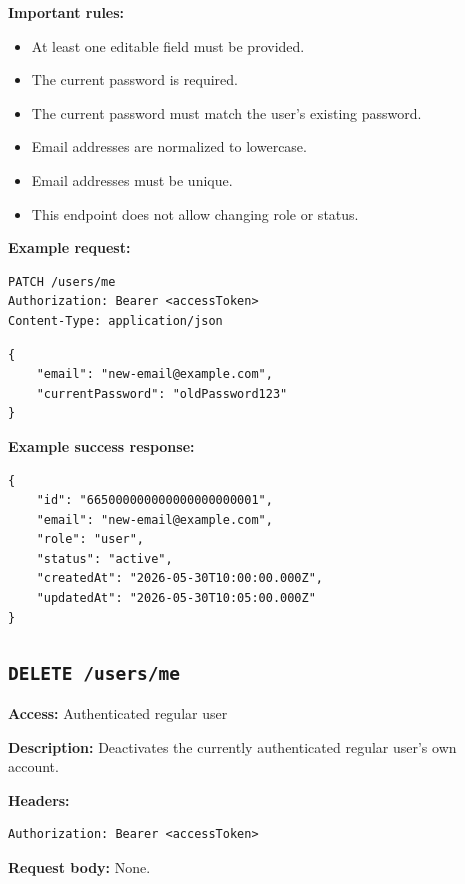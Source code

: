 \textbf{Important rules:}

\begin{itemize}
    \item At least one editable field must be provided.
    \item The current password is required.
    \item The current password must match the user's existing password.
    \item Email addresses are normalized to lowercase.
    \item Email addresses must be unique.
    \item This endpoint does not allow changing role or status.
\end{itemize}

\pagebreak
\textbf{Example request:}

\begin{verbatim}
PATCH /users/me
Authorization: Bearer <accessToken>
Content-Type: application/json
\end{verbatim}

\begin{verbatim}
{
    "email": "new-email@example.com",
    "currentPassword": "oldPassword123"
}
\end{verbatim}

\textbf{Example success response:}

\begin{verbatim}
{
    "id": "665000000000000000000001",
    "email": "new-email@example.com",
    "role": "user",
    "status": "active",
    "createdAt": "2026-05-30T10:00:00.000Z",
    "updatedAt": "2026-05-30T10:05:00.000Z"
}
\end{verbatim}

\subsection{\texttt{DELETE /users/me}}

\textbf{Access:} Authenticated regular user

\textbf{Description:} Deactivates the currently authenticated regular user's own account.

\textbf{Headers:}

\begin{verbatim}
Authorization: Bearer <accessToken>
\end{verbatim}

\textbf{Request body:} None.

